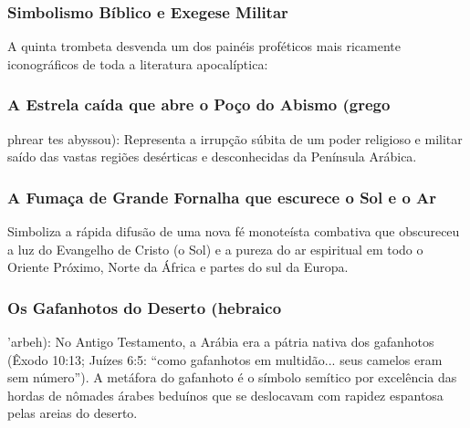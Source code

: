 \subsubsection*{Simbolismo Bíblico e Exegese Militar}
A quinta trombeta desvenda um dos painéis proféticos mais ricamente iconográficos de toda a literatura apocalíptica:

\subsubsection*{A Estrela caída que abre o Poço do Abismo (grego}
phrear tes abyssou): Representa a irrupção súbita de um poder religioso e militar saído das vastas regiões desérticas e desconhecidas da Península Arábica.

\subsubsection*{A Fumaça de Grande Fornalha que escurece o Sol e o Ar}
Simboliza a rápida difusão de uma nova fé monoteísta combativa que obscureceu a luz do Evangelho de Cristo (o Sol) e a pureza do ar espiritual em todo o Oriente Próximo, Norte da África e partes do sul da Europa.

\subsubsection*{Os Gafanhotos do Deserto (hebraico}
'arbeh): No Antigo Testamento, a Arábia era a pátria nativa dos gafanhotos (Êxodo 10:13; Juízes 6:5: ``como gafanhotos em multidão... seus camelos eram sem número''). A metáfora do gafanhoto é o símbolo semítico por excelência das hordas de nômades árabes beduínos que se deslocavam com rapidez espantosa pelas areias do deserto.

